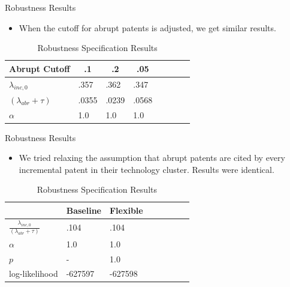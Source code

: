 \documentclass[11pt]{beamer}
\begin{document}
\begin{frame}{Robustness Results}
	\begin{itemize} \itemsep 12pt
		\item When the cutoff for abrupt patents is adjusted, we get similar results.
	\end{itemize}
	\begin{table}
		\caption*{Robustness Specification Results}
		\centering
		\begin{tabular}{l llp{1.5cm} p{0.5cm} llp{1.5cm}}
			\toprule
			Abrupt Cutoff & \multicolumn{1}{c}{.1} & \multicolumn{1}{c}{.2} & \multicolumn{1}{c}{.05}\\ 
			\midrule
			$\lambda_{inc, 0}$ & .357 & .362 & .347 \\
			$(\lambda_{abr} + \tau)$ & .0355 & .0239 & .0568\\
			$\alpha$ & 1.0 & 1.0 & 1.0\\
			\bottomrule
		\end{tabular}
	\end{table}
\end{frame}

\begin{frame}{Robustness Results}
	\begin{itemize} \itemsep 12pt
		\item We tried relaxing the assumption that abrupt patents are cited by every incremental patent in their technology cluster. Results were identical.
	\end{itemize}
	\begin{table}
		\caption*{Robustness Specification Results}
		\centering
		\begin{tabular}{l llp{1.5cm} p{0.5cm} llp{1.5cm}}
			\toprule
			    & \multicolumn{1}{c}{Baseline} & \multicolumn{1}{c}{Flexible}\\ 
			\midrule
			$\frac{\lambda_{inc, 0}}{(\lambda_{abr} + \tau)}$ & .104 & .104 \\
			$\alpha$ & 1.0 & 1.0\\
			$p$ & - & 1.0 \\
			log-likelihood & -627597 & -627598 \\
			\bottomrule
		\end{tabular}
	\end{table}
\end{frame}
\end{document}
